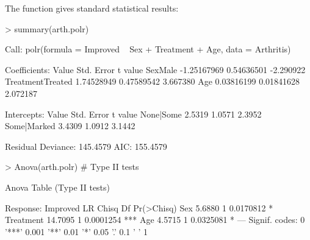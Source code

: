 \begin{frame}
The  function gives standard statistical results:
\begin{Rin}
> summary(arth.polr)
\end{Rin}
\begin{Rout}[baselinestretch=0.8,fontsize=\footnotesize]
Call:
polr(formula = Improved ~ Sex + Treatment + Age, data = Arthritis)

Coefficients:
                       Value Std. Error   t value
SexMale          -1.25167969 0.54636501 -2.290922
TreatmentTreated  1.74528949 0.47589542  3.667380
Age               0.03816199 0.01841628  2.072187

Intercepts:
            Value   Std. Error t value
None|Some    2.5319  1.0571     2.3952
Some|Marked  3.4309  1.0912     3.1442

Residual Deviance: 145.4579 
AIC: 155.4579
\end{Rout} 
\begin{Rin}
> Anova(arth.polr)      # Type II tests
\end{Rin}
\begin{Rout}[baselinestretch=0.8,fontsize=\footnotesize]
Anova Table (Type II tests)

Response: Improved
          LR Chisq Df Pr(>Chisq)    
Sex         5.6880  1  0.0170812 *  
Treatment  14.7095  1  0.0001254 ***
Age         4.5715  1  0.0325081 *  
---
Signif. codes:  0 '***' 0.001 '**' 0.01 '*' 0.05 '.' 0.1 ' ' 1  
\end{Rout} 

\end{frame}

